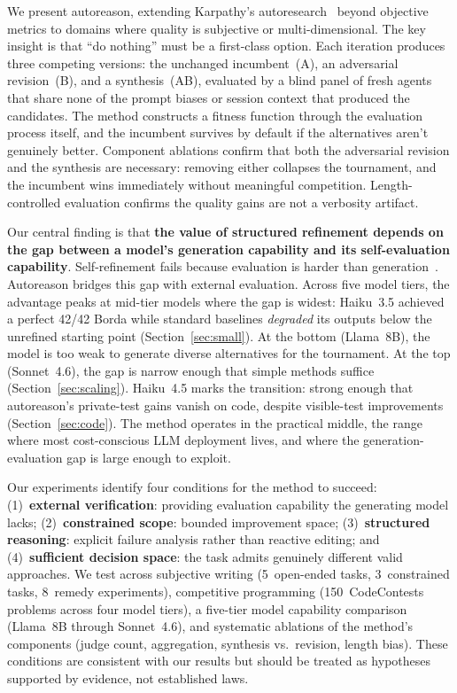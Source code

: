 \documentclass[11pt]{article}
\begin{document}
We present autoreason, extending Karpathy's autoresearch~\cite{autoresearch} beyond objective metrics to domains where quality is subjective or multi-dimensional. The key insight is that ``do nothing'' must be a first-class option. Each iteration produces three competing versions: the unchanged incumbent~(A), an adversarial revision~(B), and a synthesis~(AB), evaluated by a blind panel of fresh agents that share none of the prompt biases or session context that produced the candidates. The method constructs a fitness function through the evaluation process itself, and the incumbent survives by default if the alternatives aren't genuinely better. Component ablations confirm that both the adversarial revision and the synthesis are necessary: removing either collapses the tournament, and the incumbent wins immediately without meaningful competition. Length-controlled evaluation confirms the quality gains are not a verbosity artifact.

Our central finding is that \textbf{the value of structured refinement depends on the gap between a model's generation capability and its self-evaluation capability}. Self-refinement fails because evaluation is harder than generation~\cite{huang2023}. Autoreason bridges this gap with external evaluation. Across five model tiers, the advantage peaks at mid-tier models where the gap is widest: Haiku~3.5 achieved a perfect 42/42 Borda while standard baselines \textit{degraded} its outputs below the unrefined starting point (Section~\ref{sec:small}). At the bottom (Llama~8B), the model is too weak to generate diverse alternatives for the tournament. At the top (Sonnet~4.6), the gap is narrow enough that simple methods suffice (Section~\ref{sec:scaling}). Haiku~4.5 marks the transition: strong enough that autoreason's private-test gains vanish on code, despite visible-test improvements (Section~\ref{sec:code}). The method operates in the practical middle, the range where most cost-conscious LLM deployment lives, and where the generation-evaluation gap is large enough to exploit.

Our experiments identify four conditions for the method to succeed: (1)~\textbf{external verification}: providing evaluation capability the generating model lacks; (2)~\textbf{constrained scope}: bounded improvement space; (3)~\textbf{structured reasoning}: explicit failure analysis rather than reactive editing; and (4)~\textbf{sufficient decision space}: the task admits genuinely different valid approaches. We test across subjective writing (5~open-ended tasks, 3~constrained tasks, 8~remedy experiments), competitive programming (150~CodeContests problems across four model tiers), a five-tier model capability comparison (Llama~8B through Sonnet~4.6), and systematic ablations of the method's components (judge count, aggregation, synthesis vs.\ revision, length bias). These conditions are consistent with our results but should be treated as hypotheses supported by evidence, not established laws.
\end{document}
